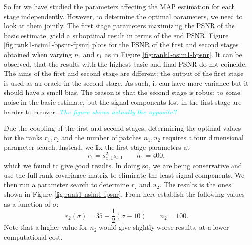 \documentclass[10pt, journal, twocolumn, final, a4paper]{IEEEtran}
\newcommand{\pa}[1]{\textcolor{cyan}{#1}}
\newcommand{\pcomment}[1]{\textit{\pa{#1}}}
\begin{document}
So far we have studied the parameters affecting the MAP estimation for each stage 
independently. However, to determine the optimal parameters, we need to look at
them jointly. The first stage parameters maximizing the PSNR of the basic
estimate, yield a suboptimal result in terms of the end PSNR.
%
Figure \ref{fig:rank1-nsim1-bpsnr-fpsnr} plots for the PSNR of the first and
second stages obtained when varying $n_1$ and $r_1$ as in Figure
\ref{fig:rank1-nsim1-bpsnr}. It can be observed, that the 
results with the highest basic and final PSNR do not coincide.
%
The aims of the first and second stage are different: the output 
of the first stage is used as an oracle in the second stage. As such, it can
have more variance but it should have a small bias. The reason is that the
second stage is robust to some noise in the basic estimate, but
the signal components lost in the first stage are harder to recover.
\pcomment{The figure shows actually the opposite!!}

Due the coupling of the first and second stages, determining the optimal values
for the ranks $r_1, r_2$ and the number of patches $n_1,n_2$ requires a four
dimensional parameter search.
%
Instead, we fix the first stage parameters at
\[r_1 = s_{x,1}^2s_{t,1}\quad\quad n_{1} = 400,\]
which we found to give good results. In doing so, we are being conservative and
use the full rank covariance matrix to eliminate the least signal components.
%
We then run a parameter search to determine $r_2$ and $n_{2}$.
The results is the ones shown in Figure \ref{fig:rank1-nsim1-fpsnr}. From here
establish the following values as a function of $\sigma$:
\[r_2(\sigma) = 35 - \frac12(\sigma - 10)\quad\quad n_{2} = 100.\]
Note that a higher value for $n_{2}$ would give slightly worse results,
at a lower computational cost.
\end{document}
